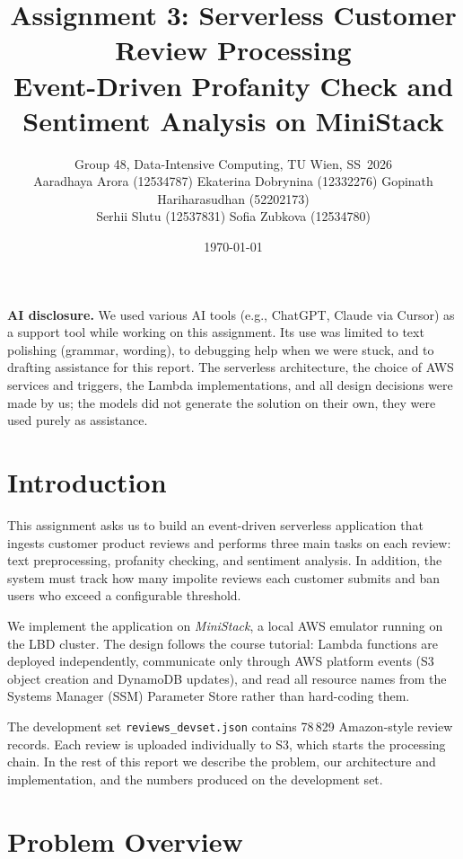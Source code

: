 \documentclass[11pt,a4paper]{article}
\title{\vspace{-1cm}Assignment 3: Serverless Customer Review Processing\\
       \large Event-Driven Profanity Check and Sentiment Analysis on MiniStack}
\author{
Group 48, Data-Intensive Computing, TU Wien, SS~2026\\[2pt]
\small
Aaradhaya Arora (12534787) \quad
Ekaterina Dobrynina (12332276) \quad
Gopinath Hariharasudhan (52202173) \\[1pt]
\small
Serhii Slutu (12537831) \quad
Sofia Zubkova (12534780)
}
\date{\today}
\begin{document}
\maketitle

\vspace{-0.4cm}

\noindent\textbf{AI disclosure.}
We used various AI tools (e.g., ChatGPT, Claude via Cursor) as a support tool while working on this
assignment. Its use was limited to text polishing (grammar, wording), to
debugging help when we were stuck, and to drafting assistance for this
report. The serverless architecture, the choice of AWS services and
triggers, the Lambda implementations, and all design decisions were made
by us; the models did not generate the solution on their own, they were
used purely as assistance.

\vspace{0.2cm}

\section{Introduction}

This assignment asks us to build an event-driven serverless application
that ingests customer product reviews and performs three main tasks on
each review: text preprocessing, profanity checking, and sentiment
analysis. In addition, the system must track how many impolite reviews
each customer submits and ban users who exceed a configurable threshold.

We implement the application on \emph{MiniStack}, a local AWS emulator
running on the LBD cluster. The design follows the course tutorial:
Lambda functions are deployed independently, communicate only through
AWS platform events (S3 object creation and DynamoDB updates), and read
all resource names from the Systems Manager (SSM) Parameter Store rather
than hard-coding them.

The development set \texttt{reviews\_devset.json} contains 78\,829
Amazon-style review records. Each review is uploaded individually to S3,
which starts the processing chain. In the rest of this report we describe
the problem, our architecture and implementation, and the numbers
produced on the development set.

\section{Problem Overview}
\end{document}
